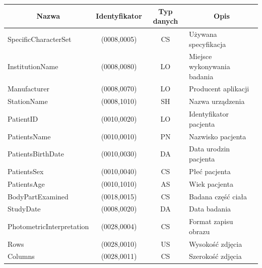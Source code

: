\documentclass[aspectratio=169]{beamer}
\newcommand*{\thead}[1]{\multicolumn{1}{|c|}{\bfseries #1}}
\begin{document}
\begin{frame}[t]
\begin{columns}[t]
        \tiny
        \begin{tabular}{|l|c|c|l|}
            \hline
            \thead{Nazwa}             & \thead{Identyfikator} & \thead{Typ danych} & \thead{Opis}                \\\hline
            SpecificCharacterSet      & (0008,0005)           & CS                 & Używana specyfikacja        \\\hline
            InstitutionName           & (0008,0080)           & LO                 & Miejsce wykonywania badania \\\hline
            Manufacturer              & (0008,0070)           & LO                 & Producent aplikacji         \\\hline
            StationName               & (0008,1010)           & SH                 & Nazwa urządzenia            \\\hline
            PatientID                 & (0010,0020)           & LO                 & Identyfikator pacjenta      \\\hline
            PatientsName              & (0010,0010)           & PN                 & Nazwisko pacjenta           \\\hline
            PatientsBirthDate         & (0010,0030)           & DA                 & Data urodzin pacjenta       \\\hline
            PatientsSex               & (0010,0040)           & CS                 & Płeć pacjenta               \\\hline
            PatientsAge               & (0010,1010)           & AS                 & Wiek pacjenta               \\\hline
            BodyPartExamined          & (0018,0015)           & CS                 & Badana część ciała          \\\hline
            StudyDate                 & (0008,0020)           & DA                 & Data badania                \\\hline
            PhotometricInterpretation & (0028,0004)           & CS                 & Format zapisu obrazu        \\\hline
            Rows                      & (0028,0010)           & US                 & Wysokość zdjęcia            \\\hline
            Columns                   & (0028,0011)           & CS                 & Szerokość zdjęcia           \\\hline
        \end{tabular}


\end{columns}
\end{frame}
\end{document}
